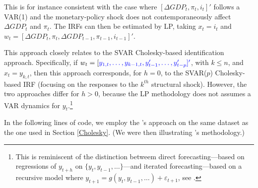 \documentclass[
  12pt,
]{book}
\theoremstyle{definition}
\theoremstyle{definition}
\theoremstyle{definition}
\theoremstyle{definition}
\theoremstyle{remark}
\begin{document}
This is for instance consistent with the case where \([\Delta GDP_t, \pi_t,i_t]'\) follows a VAR(1) and the monetary-policy shock does not contemporaneously affect \(\Delta GDP_t\) and \(\pi_t\). The IRFs can then be estimated by LP, taking \(x_t = i_t\) and \(w_t = [\Delta GDP_t,\pi_t,\Delta GDP_{t-1}, \pi_{t-1},i_{t-1}]'\).

This approach closely relates to the SVAR Cholesky-based identification approach. Specifically, if \(w_t = [\color{blue}{y_{1,t},\dots,y_{k-1,t}}, y_{t-1}',\dots,y_{t-p}']'\), with \(k\le n\), and \(x_t = y_{k,t}\), then this approach corresponds, for \(h=0\), to the SVAR(\(p\)) Cholesky-based IRF (focusing on the responses to the \(k^{th}\) structural shock). However, the two approaches differ for \(h>0\), because the LP methodology does not assumes a VAR dynamics for \(y_t\).\footnote{This is reminiscent of the distinction betweem direct forecasting---based on regressions of \(y_{t+h}\) on \(\{y_t,y_{t-1},\dots\}\)---and iterated forecasting---based on a recursive model where \(y_{t+1} = g(y_t,y_{t-1},\dots)+\varepsilon_{t+1}\), see \citet{Marcellino_et_al_2006}.}

In the following lines of code, we employ the \citet{Jorda_2005}'s approach on the same dataset as the one used in Section \ref{Cholesky}. (We were then illustrating \citet{Christiano_Eichenbaum_Evans_1996}'s methodology.)
\end{document}
